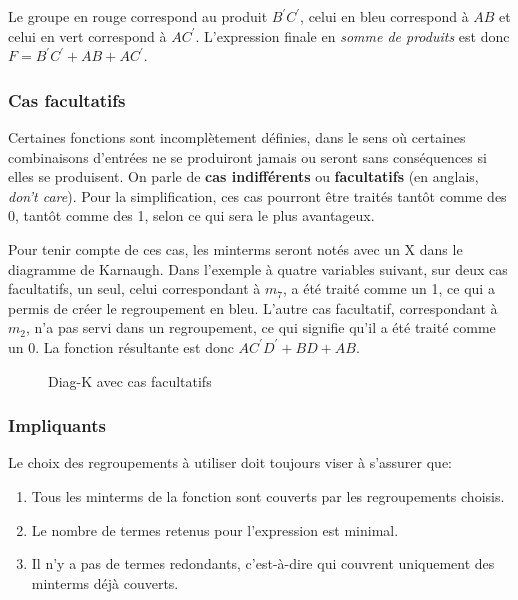 \documentclass[11pt]{article}
\begin{document}
Le groupe en rouge correspond au produit \(B^\prime C^\prime\), celui
en bleu correspond à \(A B\) et celui en vert correspond à \(A
C^\prime\). L'expression finale en \emph{somme de produits} est donc \(F =
B^\prime C^\prime + A B + A C^\prime\).

\subsubsection{Cas facultatifs}
\label{sec:org8677ef1}

Certaines fonctions sont incomplètement définies, dans le sens où
certaines combinaisons d'entrées ne se produiront jamais ou seront
sans conséquences si elles se produisent. On parle de \textbf{cas
indifférents} ou \textbf{facultatifs} (en anglais, \emph{don't care}). Pour la
simplification, ces cas pourront être traités tantôt comme des 0,
tantôt comme des 1, selon ce qui sera le plus avantageux.

Pour tenir compte de ces cas, les minterms seront notés avec un X dans
le diagramme de Karnaugh. Dans l'exemple à quatre variables suivant,
sur deux cas facultatifs, un seul, celui correspondant à \(m_{7}\), a
été traité comme un 1, ce qui a permis de créer le regroupement en
bleu. L'autre cas facultatif, correspondant à \(m_{2}\), n'a pas servi
dans un regroupement, ce qui signifie qu'il a été traité comme
un 0. La fonction résultante est donc \(A C^\prime D^\prime + BD + AB\).

\begin{figure}[htbp]
\centering

\caption{\label{fig:org4547c2a}Diag-K avec cas facultatifs}
\end{figure}


\subsubsection{Impliquants}
\label{sec:org9f55cd8}

Le choix des regroupements à utiliser doit toujours viser à s'assurer que:
\begin{enumerate}
\item Tous les minterms de la fonction sont couverts par les regroupements choisis.
\item Le nombre de termes retenus pour l'expression est minimal.
\item Il n'y a pas de termes redondants, c'est-à-dire qui couvrent
uniquement des minterms déjà couverts.
\end{enumerate}
\end{document}
